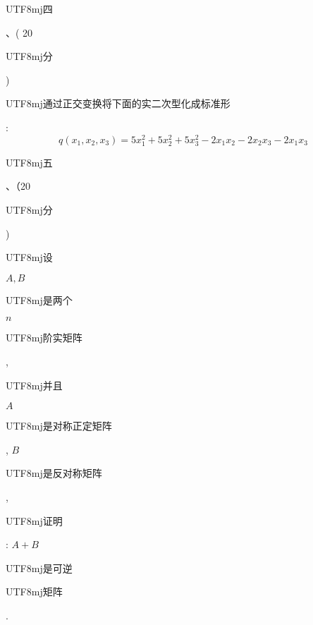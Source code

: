 \documentclass[10pt]{article}
\begin{document}
\begin{CJK}{UTF8}{mj}四\end{CJK}、( 20 \begin{CJK}{UTF8}{mj}分\end{CJK}) \begin{CJK}{UTF8}{mj}通过正交变换将下面的实二次型化成标准形\end{CJK}:
$$
q\left(x_{1}, x_{2}, x_{3}\right)=5 x_{1}^{2}+5 x_{2}^{2}+5 x_{3}^{2}-2 x_{1} x_{2}-2 x_{2} x_{3}-2 x_{1} x_{3}
$$
\begin{CJK}{UTF8}{mj}五\end{CJK}、（20 \begin{CJK}{UTF8}{mj}分\end{CJK}) \begin{CJK}{UTF8}{mj}设\end{CJK} $A, B$ \begin{CJK}{UTF8}{mj}是两个\end{CJK} $n$ \begin{CJK}{UTF8}{mj}阶实矩阵\end{CJK}, \begin{CJK}{UTF8}{mj}并且\end{CJK} $A$ \begin{CJK}{UTF8}{mj}是对称正定矩阵\end{CJK}, $B$ \begin{CJK}{UTF8}{mj}是反对称矩阵\end{CJK}, \begin{CJK}{UTF8}{mj}证明\end{CJK}: $A+B$ \begin{CJK}{UTF8}{mj}是可逆\end{CJK} \begin{CJK}{UTF8}{mj}矩阵\end{CJK}.
\end{document}
